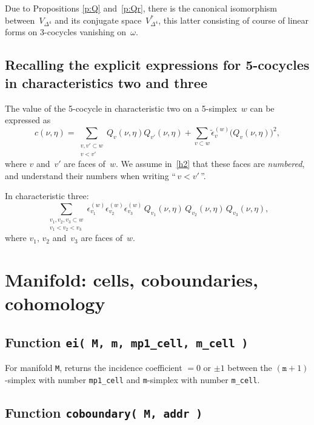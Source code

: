 \documentclass[12pt]{article}
\theoremstyle{definition}
\theoremstyle{remark}
\begin{document}
Due to Propositions \ref{p:Q} and~\ref{p:Qr}, there is the canonical isomorphism between~$V_{\Delta^4}$ and its conjugate space~$V_{\Delta^4}^*$, this latter consisting of course of linear forms on 3-cocycles vanishing on~$\omega$.

\subsection{Recalling the explicit expressions for 5-cocycles in characteristics two and three}

The value of the 5-cocycle in characteristic two on a 5-simplex~$w$ can be expressed as
\begin{equation}\label{h2}
 c(\nu, \eta) =
 \sum _{\substack{v,v'\subset w\\ v < v'}} Q_v(\nu, \eta) Q_{v'}(\nu, \eta)
 +\sum _{v\subset w} \tilde{\epsilon}_v^{(w)} \bigl( Q_v(\nu, \eta) \bigr)^2,
\end{equation}
where $v$ and~$v'$ are faces of~$w$. We assume in~\eqref{h2} that these faces are \emph{numbered}, and understand their numbers when writing ``\,$v < v'$\,''.

In characteristic three:
\begin{equation}\label{h3}
\sum _{\substack{v_1,v_2,v_3\subset w\\ v_1 < v_2 < v_3}} \epsilon _{v_1}^{(w)} \epsilon _{v_2}^{(w)} \epsilon _{v_3}^{(w)}\, Q_{v_1}(\nu, \eta)\, Q_{v_2}(\nu, \eta)\, Q_{v_3}(\nu, \eta),
\end{equation}
where $v_1$, $v_2$ and~$v_3$ are faces of~$w$.



\section{Manifold: cells, coboundaries, cohomology}\label{s:M}

\subsection{Function \texttt{ei( M, m, mp1\_cell, m\_cell )}}

For manifold \texttt{M}, returns the incidence coefficient $=0$ or $\pm 1$ between the $(\texttt{m}+1)$-simplex with number \texttt{mp1\_cell} and \texttt{m}-simplex with number \texttt{m\_cell}.

\subsection{Function \texttt{coboundary( M, addr )}}
\end{document}
